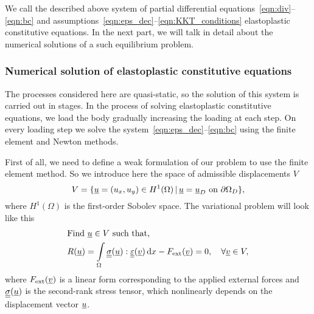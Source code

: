 \documentclass[12pt]{article}
\begin{document}
We call the described above system of partial differential equations~\eqref{eqn:div}--\eqref{eqn:bc} and assumptions~\eqref{eqn:eps_dec}--\eqref{eqn:KKT_conditions} elastoplastic constitutive equations. In the next part, we will talk in detail about the numerical solutions of a such equilibrium problem.

\subsubsection{Numerical solution of elastoplastic constitutive equations}
\label{sec:theory:classical_plasticity}

The processes considered here are quasi-static, so the solution of this system is carried out in stages. In the process of solving elastoplastic constitutive equations, we load the body gradually increasing the loading at each step. On every loading step we solve the system~\eqref{eqn:eps_dec}--\eqref{eqn:bc} using the finite element and Newton methods. 

First of all, we need to define a weak formulation of our problem to use the finite element method. So we introduce here the space of admissible displacements $V$
\begin{equation}
    V = \{\underline{u} = (u_x, u_y) \in H^1(\Omega) \, | \, \underline{u} = \underline{u}_D \text{ on } \partial\Omega_D \},
\end{equation}
where $H^1(\Omega)$ is the first-order Sobolev space. The variational problem will look like this 
\begin{align}
    & \text{Find } \underline{u} \in V \text{ such that,} \label{eqn:var_from_1} \\ 
    & R(\underline{u}) = \int\limits_\Omega\underline{\underline{\sigma}}(\underline{u}) : \underline{\underline{\varepsilon}}(\underline{v}) \, \mathrm{d} x - F_\text{ext}(\underline{v}) = 0, \quad \forall \underline{v} \in V \label{eqn:var_from_2},
\end{align}
where $F_\text{ext}(\underline{v})$ is a linear form corresponding to the applied external forces and $\underline{\underline{\sigma}}(\underline{u})$ is the second-rank stress tensor, which nonlinearly depends on the displacement vector $\underline{u}$.
\end{document}
